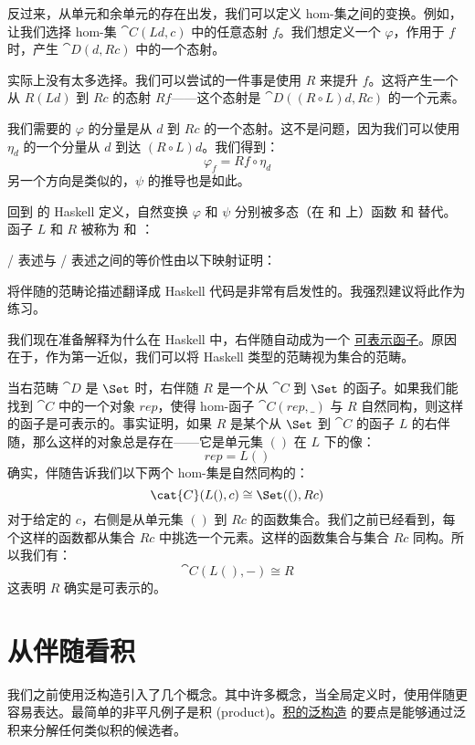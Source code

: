 反过来，从单元和余单元的存在出发，我们可以定义 hom-集之间的变换。例如，让我们选择 hom-集 $\cat{C}(L d, c)$ 中的任意态射 $f$。我们想定义一个 $\varphi$，作用于 $f$ 时，产生 $\cat{D}(d, R c)$ 中的一个态射。

实际上没有太多选择。我们可以尝试的一件事是使用 $R$ 来提升 $f$。这将产生一个从 $R (L d)$ 到 $R c$ 的态射 $R f$——这个态射是 $\cat{D}((R \circ L) d, R c)$ 的一个元素。

我们需要的 $\varphi$ 的分量是从 $d$ 到 $R c$ 的一个态射。这不是问题，因为我们可以使用 $\eta_d$ 的一个分量从 $d$ 到达 $(R \circ L) d$。我们得到：
\[\varphi_f = R f \circ \eta_d\]
另一个方向是类似的，$\psi$ 的推导也是如此。

回到  的 Haskell 定义，自然变换 $\varphi$ 和 $\psi$ 分别被多态（在  和  上）函数  和  替代。函子 $L$ 和 $R$ 被称为  和 ：

/ 表述与 /\allowbreak{} 表述之间的等价性由以下映射证明：

将伴随的范畴论描述翻译成 Haskell 代码是非常有启发性的。我强烈建议将此作为练习。

我们现在准备解释为什么在 Haskell 中，右伴随自动成为一个 \hyperref[representable-functors]{可表示函子}。原因在于，作为第一近似，我们可以将 Haskell 类型的范畴视为集合的范畴。

当右范畴 $\cat{D}$ 是 $\Set$ 时，右伴随 $R$ 是一个从 $\cat{C}$ 到 $\Set$ 的函子。如果我们能找到 $\cat{C}$ 中的一个对象 $\mathit{rep}$，使得 hom-函子 $\cat{C}(\mathit{rep}, \_)$ 与 $R$ 自然同构，则这样的函子是可表示的。事实证明，如果 $R$ 是某个从 $\Set$ 到 $\cat{C}$ 的函子 $L$ 的右伴随，那么这样的对象总是存在——它是单元集 $()$ 在 $L$ 下的像：
\[\mathit{rep} = L ()\]
确实，伴随告诉我们以下两个 hom-集是自然同构的：
\[\cat{C}(L (), c) \cong \Set((), R c)\]
对于给定的 $c$，右侧是从单元集 $()$ 到 $R c$ 的函数集合。我们之前已经看到，每个这样的函数都从集合 $R c$ 中挑选一个元素。这样的函数集合与集合 $R c$ 同构。所以我们有：
\[\cat{C}(L (), -) \cong R\]
这表明 $R$ 确实是可表示的。

\section{从伴随看积}

我们之前使用泛构造引入了几个概念。其中许多概念，当全局定义时，使用伴随更容易表达。最简单的非平凡例子是积 (product)。\hyperref[products-and-coproducts]{积的泛构造} 的要点是能够通过泛积来分解任何类似积的候选者。

